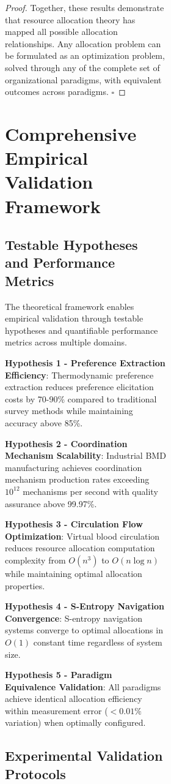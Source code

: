 \documentclass[12pt,a4paper]{article}
\begin{document}
\begin{figure}[H]
\begin{figure}[H]
\begin{figure}[H]
\begin{proof}
Together, these results demonstrate that resource allocation theory has mapped all possible allocation relationships. Any allocation problem can be formulated as an optimization problem, solved through any of the complete set of organizational paradigms, with equivalent outcomes across paradigms. $\square$
\end{proof}

\section{Comprehensive Empirical Validation Framework}

\subsection{Testable Hypotheses and Performance Metrics}

The theoretical framework enables empirical validation through testable hypotheses and quantifiable performance metrics across multiple domains.

\textbf{Hypothesis 1 - Preference Extraction Efficiency}: Thermodynamic preference extraction reduces preference elicitation costs by 70-90\% compared to traditional survey methods while maintaining accuracy above 85\%.

\textbf{Hypothesis 2 - Coordination Mechanism Scalability}: Industrial BMD manufacturing achieves coordination mechanism production rates exceeding $10^{12}$ mechanisms per second with quality assurance above 99.97\%.

\textbf{Hypothesis 3 - Circulation Flow Optimization}: Virtual blood circulation reduces resource allocation computation complexity from $O(n^3)$ to $O(n \log n)$ while maintaining optimal allocation properties.

\textbf{Hypothesis 4 - S-Entropy Navigation Convergence}: S-entropy navigation systems converge to optimal allocations in $O(1)$ constant time regardless of system size.

\textbf{Hypothesis 5 - Paradigm Equivalence Validation}: All paradigms achieve identical allocation efficiency within measurement error ($< 0.01\%$ variation) when optimally configured.

\subsection{Experimental Validation Protocols}


\end{figure}
\end{figure}
\end{figure}
\end{document}
